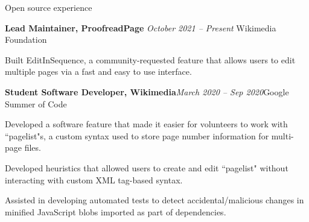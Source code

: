 \documentclass{resume} %
\begin{document}
\begin{rSection}{Open source experience}
\begin{rSubsection}{ \bf Lead Maintainer, ProofreadPage}{ \em October 2021 -- Present }{Wikimedia Foundation}{}
\item Built EditInSequence, a community-requested feature that allows users to edit multiple pages via a fast and easy to use interface.
\end{rSubsection}
%
\begin{rSubsection}{ \bf Student Software Developer, Wikimedia}{\em March 2020 -- Sep 2020}{Google Summer of Code}{}
\item Developed a software feature that made it easier for volunteers to work with ``pagelist"s, a custom syntax used to store page number information for multi-page files.
\item Developed heuristics that allowed users to create and edit ``pagelist" without interacting with custom XML tag-based syntax.
\item Assisted in developing automated tests to detect accidental/malicious changes in minified JavaScript blobs imported as part of dependencies.
\end{rSubsection}
\end{rSection}
\end{document}
